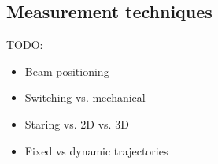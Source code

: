 \subsection{Measurement techniques}
\label{sec:intro_meas_tech}

TODO:
\begin{itemize}
\color{red}
    \item Beam positioning
    \item Switching vs. mechanical
    \item Staring vs. 2D vs. 3D
    \item Fixed vs dynamic trajectories
\end{itemize}



\clearpage